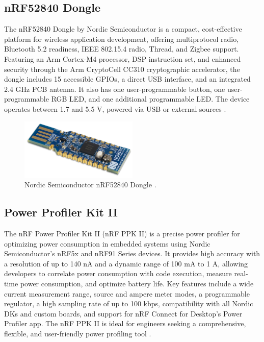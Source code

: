 \subsection{nRF52840 Dongle}
The nRF52840 Dongle by Nordic Semiconductor is a compact, cost-effective platform for wireless application development, offering multiprotocol radio, Bluetooth 5.2 readiness, IEEE 802.15.4 radio, Thread, and Zigbee support. Featuring an Arm Cortex-M4 processor, DSP instruction set, and enhanced security through the Arm CryptoCell CC310 cryptographic accelerator, the dongle includes 15 accessible GPIOs, a direct USB interface, and an integrated 2.4 GHz PCB antenna. It also has one user-programmable button, one user-programmable RGB LED, and one additional programmable LED. The device operates between 1.7 and 5.5 V, powered via USB or external sources \cite{Semiconductor_Nordic_Dongle_Brief_2018_2.0}.

\begin{figure}[!htb]
    \centering
    \includegraphics[width=0.5\textwidth]{images/situational_theoretical_analysis/nRF52840_Dongle.png}
    \caption{Nordic Semiconductor nRF52840 Dongle \cite{Semiconductor_Nordic_Dongle_Brief_2018_2.0}.}
    \label{fig:nRF52840_Dongle}
\end{figure}

\subsection{Power Profiler Kit II}
The nRF Power Profiler Kit II (nRF PPK II) is a precise power profiler for optimizing power consumption in embedded systems using Nordic Semiconductor's nRF5x and nRF91 Series devices. It provides high accuracy with a resolution of up to 140 nA and a dynamic range of 100 mA to 1 A, allowing developers to correlate power consumption with code execution, measure real-time power consumption, and optimize battery life. Key features include a wide current measurement range, source and ampere meter modes, a programmable regulator, a high sampling rate of up to 100 kbps, compatibility with all Nordic DKs and custom boards, and support for nRF Connect for Desktop's Power Profiler app. The nRF PPK II is ideal for engineers seeking a comprehensive, flexible, and user-friendly power profiling tool \cite{Semiconductor_Nordic_PPK_II_2018_1.0}.


